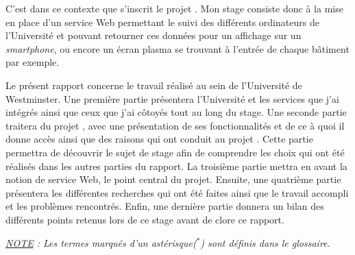 C'est dans ce contexte que s'inscrit le projet \YuukouII. 
Mon stage consiste donc \`a la mise en place d'un service Web permettant le suivi des diff\'erents ordinateurs de l'Universit\'e et pouvant retourner ces donn\'ees pour un affichage sur un \textit{smartphone}, ou encore un \'ecran plasma se trouvant \`a l'entr\'ee de chaque b\^atiment par exemple.

Le pr\'esent rapport concerne le travail r\'ealis\'e au sein de l'Universit\'e de Westminster.
Une premi\`ere partie pr\'esentera l'Universit\'e et les services que j'ai int\'egr\'es ainsi que ceux que j'ai c\^otoy\'es tout au long du stage.
Une seconde partie traitera du projet \Yuukou{}, avec une pr\'esentation de ses fonctionnalit\'es et de ce \`a quoi il donne acc\`es  ainsi que des raisons qui ont conduit au projet \YuukouII.
Cette partie permettra de d\'ecouvrir le sujet de stage afin de comprendre les choix qui ont \'et\'e r\'ealis\'es dans les autres parties du rapport.
La troisi\`eme partie mettra en avant la notion de service Web, le point central du projet.
Ensuite, une quatri\`eme partie pr\'esentera les diff\'erentes recherches qui ont \'et\'e faites ainsi que le travail accompli et les probl\`emes rencontr\'es.
Enfin, une derni\`ere partie donnera un bilan des diff\'erents points retenus lors de ce stage avant de clore ce rapport.

\vspace{1.5cm}

\begin{center}
\textit{\underline{NOTE} : Les termes marqu\'es d'un ast\'erisque($^*$) sont d\'efinis dans le glossaire.}

\end{center}

\clearpage
